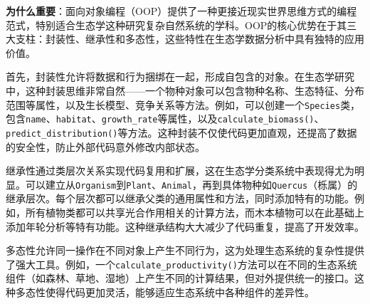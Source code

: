\documentclass[
  twoside]{book}
\newenvironment{Shaded}{\begin{snugshade}}{\end{snugshade}}
\newcommand{\AttributeTok}[1]{\textcolor[rgb]{0.13,0.29,0.53}{#1}}
\newcommand{\CommentTok}[1]{\textcolor[rgb]{0.56,0.35,0.01}{\textit{#1}}}
\newcommand{\ControlFlowTok}[1]{\textcolor[rgb]{0.13,0.29,0.53}{\textbf{#1}}}
\newcommand{\DecValTok}[1]{\textcolor[rgb]{0.00,0.00,0.81}{#1}}
\newcommand{\FunctionTok}[1]{\textcolor[rgb]{0.13,0.29,0.53}{\textbf{#1}}}
\newcommand{\NormalTok}[1]{#1}
\newcommand{\OtherTok}[1]{\textcolor[rgb]{0.56,0.35,0.01}{#1}}
\newcommand{\SpecialCharTok}[1]{\textcolor[rgb]{0.81,0.36,0.00}{\textbf{#1}}}
\newcommand{\StringTok}[1]{\textcolor[rgb]{0.31,0.60,0.02}{#1}}
\begin{document}
\begin{Shaded}
\end{Shaded}

\textbf{为什么重要}：面向对象编程（OOP）提供了一种更接近现实世界思维方式的编程范式，特别适合生态学这种研究复杂自然系统的学科。OOP的核心优势在于其三大支柱：封装性、继承性和多态性，这些特性在生态学数据分析中具有独特的应用价值。

首先，封装性允许将数据和行为捆绑在一起，形成自包含的对象。在生态学研究中，这种封装思维非常自然------一个物种对象可以包含物种名称、生态特征、分布范围等属性，以及生长模型、竞争关系等方法。例如，可以创建一个\texttt{Species}类，包含\texttt{name}、\texttt{habitat}、\texttt{growth\_rate}等属性，以及\texttt{calculate\_biomass()}、\texttt{predict\_distribution()}等方法。这种封装不仅使代码更加直观，还提高了数据的安全性，防止外部代码意外修改内部状态。

继承性通过类层次关系实现代码复用和扩展，这在生态学分类系统中表现得尤为明显。可以建立从\texttt{Organism}到\texttt{Plant}、\texttt{Animal}，再到具体物种如\texttt{Quercus}（栎属）的继承层次。每个层次都可以继承父类的通用属性和方法，同时添加特有的功能。例如，所有植物类都可以共享光合作用相关的计算方法，而木本植物可以在此基础上添加年轮分析等特有功能。这种继承结构大大减少了代码重复，提高了开发效率。

多态性允许同一操作在不同对象上产生不同行为，这为处理生态系统的复杂性提供了强大工具。例如，一个\texttt{calculate\_productivity()}方法可以在不同的生态系统组件（如森林、草地、湿地）上产生不同的计算结果，但对外提供统一的接口。这种多态性使得代码更加灵活，能够适应生态系统中各种组件的差异性。
\end{document}
